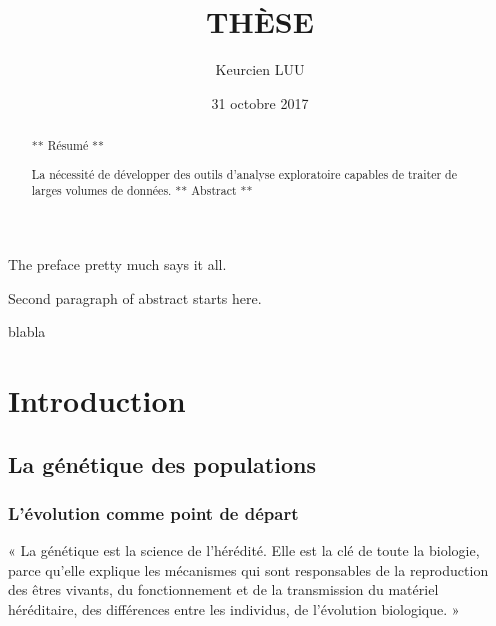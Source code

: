 \documentclass[12pt,twoside]{ugathesis}
\title{THÈSE}
\author{Keurcien LUU}
\date{31 octobre 2017}
\begin{document}
  \maketitle

\frontmatter %
\pagestyle{empty} %
  \begin{acknowledgements}
    The preface pretty much says it all. \par  Second paragraph of abstract
    starts here.
  \end{acknowledgements}
  \begin{preface}
    blabla \par
  \end{preface}
  \hypersetup{linkcolor=black}
  \setcounter{tocdepth}{2}
  \tableofcontents

  \listoftables

  \listoffigures
  \begin{abstract}
    ** Résumé ** \par  La nécessité de développer des outils d'analyse
    exploratoire capables de traiter de larges volumes de données. **
    Abstract **
  \end{abstract}

\mainmatter %
\pagestyle{fancyplain} %

\chapter{Introduction}\label{introduction}

\section{La génétique des
populations}\label{la-genetique-des-populations}

\subsection{L'évolution comme point de
départ}\label{levolution-comme-point-de-depart}

« La génétique est la science de l'hérédité. Elle est la clé de toute la
biologie, parce qu'elle explique les mécanismes qui sont responsables de
la reproduction des êtres vivants, du fonctionnement et de la
transmission du matériel héréditaire, des différences entre les
individus, de l'évolution biologique. »
\end{document}
